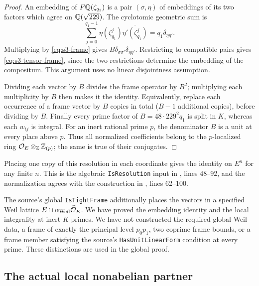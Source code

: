 \begin{proof}
An embedding of $F\mathbb Q(\zeta_{q_1})$ is a pair $(\sigma,\eta)$ of
embeddings of its two factors which agree on $\mathbb Q(\sqrt{229})$.
The cyclotomic geometric sum is
\[
 \sum_{j=0}^{q_1-1}\eta(\zeta_{q_1}^{j})
 \overline{\eta'(\zeta_{q_1}^{j})}
 =q_1\delta_{\eta\eta'}.
\]
Multiplying by \eqref{eq:s3-frame} gives
$B\delta_{\sigma\sigma'}\delta_{\eta\eta'}$.
Restricting to compatible pairs gives
\eqref{eq:s3-tensor-frame}, since the two restrictions determine
the embedding of the compositum. This argument uses no linear
disjointness assumption.

Dividing each vector by $B$ divides the frame operator by $B^2$;
multiplying each multiplicity by $B$ then makes it the identity.
Equivalently, replace each occurrence of a frame vector by $B$ copies
in total ($B-1$ additional copies), before dividing by $B$.
Finally every prime factor of $B=48\cdot229^2q_1$ is split in $K$,
whereas each $w_{ij}$ is integral. For an inert rational prime $p$,
the denominator $B$ is a unit at every place above $p$. Thus all
normalized coefficients belong to the $p$-localized ring
$\mathcal O_E\otimes_{\mathbb Z}\mathbb Z_{(p)}$; the same is true of their
conjugates.
\end{proof}

Placing one copy of this resolution in each coordinate gives the
identity on $E^n$ for any finite $n$. This is the algebraic
\texttt{IsResolution} input in
,
lines 48--92, and the normalization agrees with the construction in
,
lines 62--100.

\begin{remark}
The source's global \texttt{IsTightFrame} additionally places the
vectors in a specified Weil lattice $E\cap\alpha_{\rm Weil}\widehat
{\mathcal O}_E$. We have proved the embedding identity and the local
integrality at inert-$K$ primes. We have not constructed the required
global Weil data, a frame of exactly the principal level $p_0p_1$,
two coprime frame bounds, or a frame member satisfying the source's
\texttt{HasUnitLinearForm} condition at every prime. These distinctions
are used in the global proof.
\end{remark}

\subsection{The actual local nonabelian partner}

